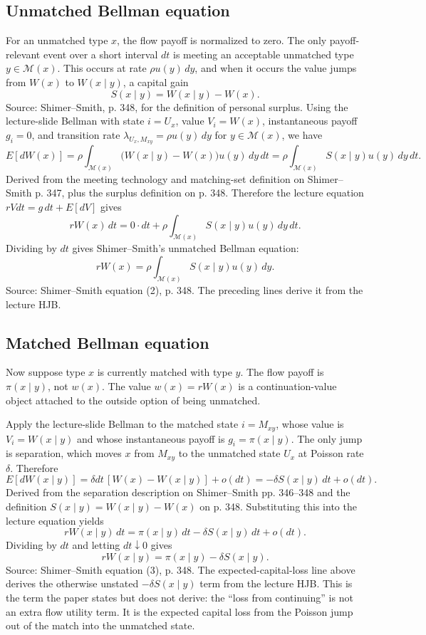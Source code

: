 \documentclass[11pt]{article}
\newcommand{\M}{\mathcal{M}}
\begin{document}
\subsection{Unmatched Bellman equation}

For an unmatched type $x$, the flow payoff is normalized to zero. The only
payoff-relevant event over a short interval $dt$ is meeting an acceptable unmatched
type $y\in\M(x)$. This occurs at rate $\rho u(y)\,dy$, and when it occurs the value
jumps from $W(x)$ to $W(x\mid y)$, a capital gain
\[
S(x\mid y)=W(x\mid y)-W(x).
\]
Source: Shimer--Smith, p. 348, for the definition of personal surplus.
Using the lecture-slide Bellman with state $i=U_x$, value $V_i=W(x)$,
instantaneous payoff $g_i=0$, and transition rate
$\lambda_{U_x,M_{xy}}=\rho u(y)\,dy$ for $y\in\M(x)$, we have
\[
E[dW(x)]
=
\rho\int_{\M(x)}\bigl(W(x\mid y)-W(x)\bigr)u(y)\,dy\,dt
=
\rho\int_{\M(x)}S(x\mid y)u(y)\,dy\,dt.
\]
Derived from the meeting technology and matching-set definition on
Shimer--Smith p. 347, plus the surplus definition on p. 348.
Therefore the lecture equation $rVdt=g\,dt+E[dV]$ gives
\[
rW(x)\,dt
=0\cdot dt+\rho\int_{\M(x)}S(x\mid y)u(y)\,dy\,dt.
\]
Dividing by $dt$ gives Shimer--Smith's unmatched Bellman equation:
\begin{equation}
rW(x)=\rho\int_{\M(x)}S(x\mid y)u(y)\,dy.
\tag{SS-2}
\end{equation}
Source: Shimer--Smith equation (2), p. 348. The preceding lines derive it from
the lecture HJB.

\subsection{Matched Bellman equation}

Now suppose type $x$ is currently matched with type $y$. The flow payoff is
$\pi(x\mid y)$, not $w(x)$. The value $w(x)=rW(x)$ is a continuation-value object
attached to the outside option of being unmatched.

Apply the lecture-slide Bellman to the matched state $i=M_{xy}$, whose value is
$V_i=W(x\mid y)$ and whose instantaneous payoff is
$g_i=\pi(x\mid y)$. The only jump is separation, which moves $x$ from
$M_{xy}$ to the unmatched state $U_x$ at Poisson rate $\delta$. Therefore
\[
E[dW(x\mid y)]
=\delta dt\,[W(x)-W(x\mid y)]+o(dt)
=-\delta S(x\mid y)\,dt+o(dt).
\]
Derived from the separation description on Shimer--Smith pp. 346--348 and the
definition $S(x\mid y)=W(x\mid y)-W(x)$ on p. 348.
Substituting this into the lecture equation yields
\[
rW(x\mid y)\,dt
=\pi(x\mid y)\,dt-\delta S(x\mid y)\,dt+o(dt).
\]
Dividing by $dt$ and letting $dt\downarrow0$ gives
\begin{equation}
rW(x\mid y)=\pi(x\mid y)-\delta S(x\mid y).
\tag{SS-3}
\end{equation}
Source: Shimer--Smith equation (3), p. 348. The expected-capital-loss line
above derives the otherwise unstated $-\delta S(x\mid y)$ term from the lecture
HJB.
This is the term the paper states but does not derive: the ``loss from
continuing'' is not an extra flow utility term. It is the expected capital loss from
the Poisson jump out of the match into the unmatched state.
\end{document}
